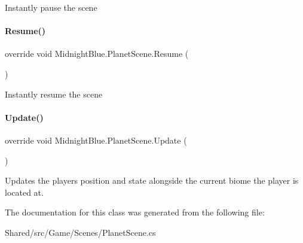 Instantly pause the scene 

\hypertarget{class_midnight_blue_1_1_planet_scene_aa14750d3675b59462796e821b3921397}{}\label{class_midnight_blue_1_1_planet_scene_aa14750d3675b59462796e821b3921397} 
\paragraph{\texorpdfstring{Resume()}{Resume()}}
{\footnotesize\ttfamily override void Midnight\+Blue.\+Planet\+Scene.\+Resume (\begin{DoxyParamCaption}{ }\end{DoxyParamCaption})\hspace{0.3cm}{\ttfamily [inline]}}



Instantly resume the scene 

\hypertarget{class_midnight_blue_1_1_planet_scene_add0a85b4f754f026231aa7269259c65c}{}\label{class_midnight_blue_1_1_planet_scene_add0a85b4f754f026231aa7269259c65c} 
\paragraph{\texorpdfstring{Update()}{Update()}}
{\footnotesize\ttfamily override void Midnight\+Blue.\+Planet\+Scene.\+Update (\begin{DoxyParamCaption}{ }\end{DoxyParamCaption})\hspace{0.3cm}{\ttfamily [inline]}}



Updates the players position and state alongside the current biome the player is located at. 



The documentation for this class was generated from the following file\+:\begin{DoxyCompactItemize}
\item 
Shared/src/\+Game/\+Scenes/Planet\+Scene.\+cs\end{DoxyCompactItemize}
